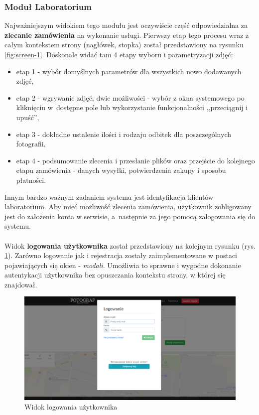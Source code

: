 \subsubsection{Moduł Laboratorium}
\quad Najważniejszym widokiem tego modułu jest oczywiście część odpowiedzialna za \textbf{zlecanie zamówienia} na wykonanie usługi. Pierwszy etap tego procesu wraz z całym kontekstem strony (nagłówek, stopka) został przedstawiony na rysunku \ref{fig:screen-1}. Doskonale widać tam 4 etapy wyboru i parametryzacji zdjęć:
\begin{itemize}
    \item etap 1 - wybór domyślnych parametrów dla wszystkich nowo dodawanych zdjęć,
    \item etap 2 - wgrywanie zdjęć; dwie możliwości - wybór z okna systemowego po kliknięciu w~dostępne pole lub wykorzystanie funkcjonalności ,,przeciągnij i upuść'',
    \item etap 3 - dokładne ustalenie ilości i rodzaju odbitek dla poszczególnych fotografii,
    \item etap 4 - podsumowanie zlecenia i przesłanie plików oraz przejście do kolejnego etapu zamówienia - danych wysyłki, potwierdzenia zakupy i sposobu płatności.
\end{itemize}

\noindent Innym bardzo ważnym zadaniem systemu jest identyfikacja klientów laboratorium. Aby mieć możliwość zlecenia zamówienia, użytkownik zobligowany jest do założenia konta w serwisie, a~następnie za jego pomocą zalogowania się do systemu. \\
\\
Widok \textbf{logowania użytkownika} został przedstawiony na kolejnym rysunku (rys. \ref{fig:screen-2}). Zarówno logowanie jak i rejestracja zostały zaimplementowane w postaci pojawiających się okien - \textit{modali}. Umożliwia to sprawne i wygodne dokonanie autentykacji użytkownika bez opuszczania kontekstu strony, w której się znajdował.

\begin{figure}[ht]
	\centering
	\includegraphics[width=0.9\linewidth]{graphics/chapter-4/screen-2.png}
	\caption{Widok logowania użytkownika}
	\label{fig:screen-2}
\end{figure}

